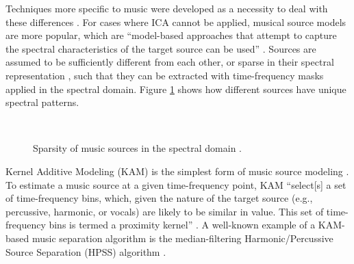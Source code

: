 \documentclass[report.tex]{subfiles}
\begin{document}
Techniques more specific to music were developed as a necessity to deal with these differences \parencite{musicseptechniques1, musicseptechniques2}. For cases where ICA cannot be applied, musical source models are more popular, which are ``model-based approaches that attempt to capture the spectral characteristics of the target source can be used'' \parencite[36]{musicsepgood}. Sources are assumed to be sufficiently different from each other, or sparse in their spectral representation \parencite{musicsepgood}, such that they can be extracted with time-frequency masks applied in the spectral domain. Figure \ref{fig:sepgood} shows how different sources have unique spectral patterns.

\begin{figure}[ht]
	\centering
	\\
	\caption{Sparsity of music sources in the spectral domain \parencite[32]{musicsepgood}.}
\label{fig:sepgood}
\end{figure}

Kernel Additive Modeling (KAM) is the simplest form of music source modeling \parencite{musicsepgood}. To estimate a music source at a given time-frequency point, KAM ``select[s] a set of time-frequency bins, which, given the nature of the target source (e.g., percussive, harmonic, or vocals) are likely to be similar in value. This set of time-frequency bins is termed a proximity kernel'' \parencite[36]{musicsepgood}. A well-known example of a KAM-based music separation algorithm is the median-filtering Harmonic/Percussive Source Separation (HPSS) algorithm \parencite{fitzgerald1}.
\end{document}
